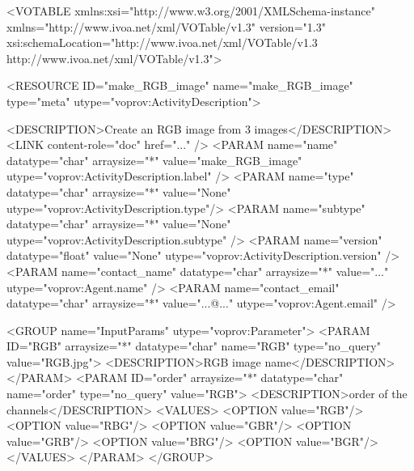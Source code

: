 \begin{verbnobox}[\scriptsize]

<VOTABLE xmlns:xsi="http://www.w3.org/2001/XMLSchema-instance" 
    xmlns="http://www.ivoa.net/xml/VOTable/v1.3" version="1.3" 
    xsi:schemaLocation="http://www.ivoa.net/xml/VOTable/v1.3 
    http://www.ivoa.net/xml/VOTable/v1.3">
    
  <RESOURCE ID="make_RGB_image" name="make_RGB_image" 
      type="meta" utype="voprov:ActivityDescription">
      
    <DESCRIPTION>Create an RGB image from 3 images</DESCRIPTION>
    <LINK content-role="doc" href="..." />
    <PARAM name="name" datatype="char" arraysize="*" 
        value="make_RGB_image" utype="voprov:ActivityDescription.label" />
    <PARAM name="type" datatype="char" arraysize="*" 
        value="None" utype="voprov:ActivityDescription.type"/>
    <PARAM name="subtype" datatype="char" arraysize="*" 
        value="None" utype="voprov:ActivityDescription.subtype" />
    <PARAM name="version" datatype="float" 
        value="None" utype="voprov:ActivityDescription.version" />
    <PARAM name="contact_name" datatype="char" arraysize="*" 
        value="..." utype="voprov:Agent.name" />
    <PARAM name="contact_email" datatype="char" arraysize="*" 
        value="...@..." utype="voprov:Agent.email" />
        
    <GROUP name="InputParams" utype="voprov:Parameter">
      <PARAM ID="RGB" arraysize="*" datatype="char" name="RGB" 
          type="no_query" value="RGB.jpg">
        <DESCRIPTION>RGB image name</DESCRIPTION>
      </PARAM>
      <PARAM ID="order" arraysize="*" datatype="char" name="order" 
          type="no_query" value="RGB">
        <DESCRIPTION>order of the channels</DESCRIPTION>
        <VALUES>
          <OPTION value="RGB"/>
          <OPTION value="RBG"/>
          <OPTION value="GBR"/>
          <OPTION value="GRB"/>
          <OPTION value="BRG"/>
          <OPTION value="BGR"/>
        </VALUES>
      </PARAM>
    </GROUP>
    

\end{verbnobox}
